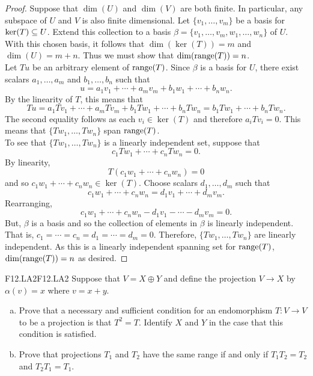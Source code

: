 \documentclass[../../AlgebraQualSolutions.tex]{subfiles}
\begin{document}
	\begin{proof}
		Suppose that $\dim(U)$ and $\dim(V)$ are both finite. In particular, any subspace of $U$ and $V$ is also finite dimensional. Let $\{v_1,\ldots, v_m\}$ be a basis for $\ker(T) \subseteq U$. Extend this collection to a basis $\beta = \{v_1,\ldots, v_m, w_1,\ldots, w_n\}$ of $U$. With this chosen basis, it follows that $\dim(\ker(T)) = m$ and $\dim(U) = m + n$. Thus we must show that $\dim(\mathrm{range}(T)) = n$.\\

		Let $Tu$ be an arbitrary element of $\mathrm{range}(T)$. Since $\beta$ is a basis for $U$, there exist scalars $a_1,\ldots, a_m$ and $b_1,\ldots,b_n$ such that
			\[u = a_1v_1 + \cdots + a_mv_m + b_1w_1 + \cdots + b_nw_n. \]
		By the linearity of $T$, this means that
			\[Tu = a_1Tv_1 + \cdots + a_mTv_m + b_1Tw_1 + \cdots + b_nTw_n = b_1Tw_1 + \cdots + b_nTw_n.\]
		The second equality follows as each $v_i \in \ker(T)$ and therefore $a_iTv_i = 0$. This means that $\{Tw_1,\ldots,Tw_n\}$ span $\mathrm{range}(T)$.\\

		To see that $\{Tw_1,\ldots,Tw_n\}$ is a linearly independent set, suppose that
			\[c_1Tw_1 + \cdots + c_nTw_n = 0.\]
		By linearity,
			\[T(c_1w_1 + \cdots + c_nw_n) = 0\]
		and so $c_1w_1 + \cdots + c_nw_n \in \ker(T)$. Choose scalars $d_1,\ldots, d_m$ such that
			\[c_1w_1 + \cdots + c_nw_n = d_1v_1 + \cdots + d_mv_m.\]
		Rearranging,
			\[c_1w_1 + \cdots + c_nw_n - d_1v_1 - \cdots - d_mv_m = 0.\]
		But, $\beta$ is a basis and so the collection of elements in $\beta$ is linearly independent. That is, $c_1 = \cdots = c_n = d_1 = \cdots = d_m = 0$. Therefore, $\{Tw_1,\ldots,Tw_n\}$ are linearly independent. As this is a linearly independent spanning set for $\mathrm{range}(T)$, $\dim(\mathrm{range}(T)) = n$ as desired.
	\end{proof}

	\begin{prob}{F12.LA2}{F12.LA2}
	Suppose that $V = X \oplus Y$ and define the projection $V \to X$ by $\alpha(v) = x$ where $v = x+y$.
	\begin{enumerate}[(a)]
	\item Prove that a necessary and sufficient condition for an endomorphism $T: V \to V$ to be a projection is that $T^2 = T$. Identify $X$ and $Y$ in the case that this condition is satisfied.
	\item Prove that projections $T_1$ and $T_2$ have the same range if and only if $T_1T_2 = T_2$ and $T_2T_1 = T_1$.
	\end{enumerate}
	\end{prob}
\end{document}
